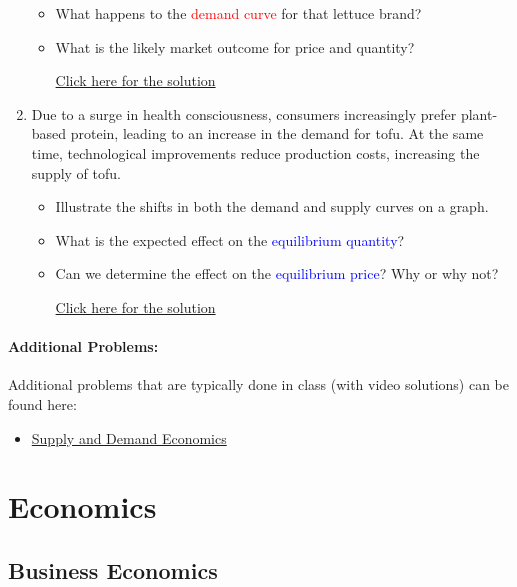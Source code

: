 \documentclass[
]{book}
\providecommand{\tightlist}{%
  \setlength{\itemsep}{0pt}\setlength{\parskip}{0pt}}
\begin{document}
\begin{enumerate}
  \begin{itemize}
  \tightlist
  \item
    What happens to the \textcolor{red}{demand curve} for that lettuce brand?
  \item
    What is the likely market outcome for price and quantity?

    \href{https://youtu.be/ChjAjdemwR4}{Click here for the solution}
  \end{itemize}
\item
  Due to a surge in health consciousness, consumers increasingly prefer plant-based protein, leading to an increase in the demand for tofu. At the same time, technological improvements reduce production costs, increasing the supply of tofu.

  \begin{itemize}
  \tightlist
  \item
    Illustrate the shifts in both the demand and supply curves on a graph.
  \item
    What is the expected effect on the \textcolor{blue}{equilibrium quantity}?
  \item
    Can we determine the effect on the \textcolor{blue}{equilibrium price}? Why or why not?

    \href{https://youtu.be/RlajAIMXlyA}{Click here for the solution}
  \end{itemize}
\end{enumerate}

\subsection*{Additional Problems:}\label{additional-problems-2}

Additional problems that are typically done in class (with video solutions) can be found here:

\begin{itemize}
\tightlist
\item
  \href{https://theelementsmath.github.io/M114/introduction-to-microeconomics.html\#supply-and-demand-economics}{Supply and Demand Economics}
\end{itemize}

\part{Economics}\label{part-economics-1}

\chapter{Business Economics}\label{business-economics}
\end{document}

